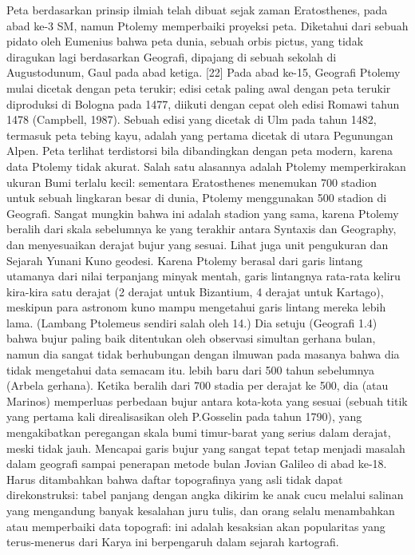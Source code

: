 	Peta berdasarkan prinsip ilmiah telah dibuat sejak zaman Eratosthenes, pada abad ke-3 SM, namun Ptolemy memperbaiki proyeksi peta. Diketahui dari sebuah pidato oleh Eumenius bahwa peta dunia, sebuah orbis pictus, yang tidak diragukan lagi berdasarkan Geografi, dipajang di sebuah sekolah di Augustodunum, Gaul pada abad ketiga. [22] Pada abad ke-15, Geografi Ptolemy mulai dicetak dengan peta terukir; edisi cetak paling awal dengan peta terukir diproduksi di Bologna pada 1477, diikuti dengan cepat oleh edisi Romawi tahun 1478 (Campbell, 1987). Sebuah edisi yang dicetak di Ulm pada tahun 1482, termasuk peta tebing kayu, adalah yang pertama dicetak di utara Pegunungan Alpen. Peta terlihat terdistorsi bila dibandingkan dengan peta modern, karena data Ptolemy tidak akurat. Salah satu alasannya adalah Ptolemy memperkirakan ukuran Bumi terlalu kecil: sementara Eratosthenes menemukan 700 stadion untuk sebuah lingkaran besar di dunia, Ptolemy menggunakan 500 stadion di Geografi. Sangat mungkin bahwa ini adalah stadion yang sama, karena Ptolemy beralih dari skala sebelumnya ke yang terakhir antara Syntaxis dan Geography, dan menyesuaikan derajat bujur yang sesuai. Lihat juga unit pengukuran dan Sejarah Yunani Kuno geodesi.
	Karena Ptolemy berasal dari garis lintang utamanya dari nilai terpanjang minyak mentah, garis lintangnya rata-rata keliru kira-kira satu derajat (2 derajat untuk Bizantium, 4 derajat untuk Kartago), meskipun para astronom kuno mampu mengetahui garis lintang mereka lebih lama. (Lambang Ptolemeus sendiri salah oleh 14.) Dia setuju (Geografi 1.4) bahwa bujur paling baik ditentukan oleh observasi simultan gerhana bulan, namun dia sangat tidak berhubungan dengan ilmuwan pada masanya bahwa dia tidak mengetahui data semacam itu. lebih baru dari 500 tahun sebelumnya (Arbela gerhana). Ketika beralih dari 700 stadia per derajat ke 500, dia (atau Marinos) memperluas perbedaan bujur antara kota-kota yang sesuai (sebuah titik yang pertama kali direalisasikan oleh P.Gosselin pada tahun 1790), yang mengakibatkan peregangan skala bumi timur-barat yang serius dalam derajat, meski tidak jauh. Mencapai garis bujur yang sangat tepat tetap menjadi masalah dalam geografi sampai penerapan metode bulan Jovian Galileo di abad ke-18. Harus ditambahkan bahwa daftar topografinya yang asli tidak dapat direkonstruksi: tabel panjang dengan angka dikirim ke anak cucu melalui salinan yang mengandung banyak kesalahan juru tulis, dan orang selalu menambahkan atau memperbaiki data topografi: ini adalah kesaksian akan popularitas yang terus-menerus dari Karya ini berpengaruh dalam sejarah kartografi.
	
